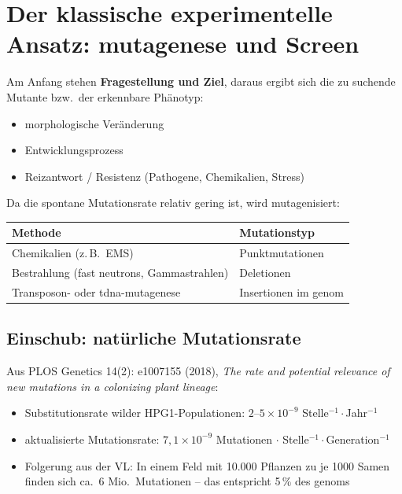 
\section{Der klassische experimentelle Ansatz: \gls{mutagenese} und Screen}\label{sec:der-klassische-experimentelle-ansatz:-mutagenese-und-screen}

Am Anfang stehen \textbf{Fragestellung und Ziel}, daraus ergibt sich die zu suchende Mutante bzw.\ der erkennbare Phänotyp:
\begin{itemize}
    \item morphologische Veränderung
    \item Entwicklungsprozess
    \item Reizantwort / Resistenz (Pathogene, Chemikalien, Stress)
\end{itemize}

Da die spontane Mutationsrate relativ gering ist, wird mutagenisiert:

\begin{mytable}
    \begin{tabular}{@{}|l|l|@{}}
        \hline
        \textbf{Methode} & \textbf{Mutationstyp} \\
        \hline
        Chemikalien (z.\,B.\ EMS) & Punktmutationen \\
        Bestrahlung (fast neutrons, Gammastrahlen) & Deletionen \\
        Transposon- oder \gls{tdna}-\gls{mutagenese} & Insertionen im \gls{genom} \\
        \hline
    \end{tabular}
\end{mytable}

\subsection*{Einschub: natürliche Mutationsrate}\label{subsec:einschub:-naturliche-mutationsrate}
Aus PLOS Genetics 14(2): e1007155 (2018), \emph{The rate and potential relevance of new mutations in a colonizing plant lineage}:
\begin{itemize}
    \item Substitutionsrate wilder HPG1-Populationen: $2$--$5\times10^{-9}$ Stelle$^{-1}\cdot$Jahr$^{-1}$
    \item aktualisierte Mutationsrate: $7{,}1\times10^{-9}$ Mutationen $\cdot$ Stelle$^{-1}\cdot$Generation$^{-1}$
    \item Folgerung aus der VL: In einem Feld mit 10.000 Pflanzen zu je 1000 Samen finden sich ca.\ 6 Mio.\ Mutationen -- das entspricht 5\,\% des \gls{genom}s
\end{itemize}

